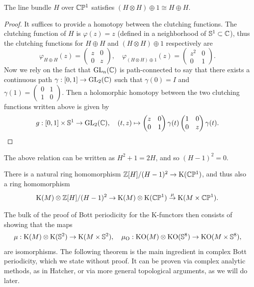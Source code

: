\begin{prop}
    The line bundle $H$ over $\mathbb{C}\mathbb{P}^1$ satisfies $(H\otimes H)\oplus 1\cong H\oplus H$.
\end{prop}
\begin{proof}
    It suffices to provide a homotopy between the clutching functions. The clutching function of $H$ is $\varphi(z)=z$ (defined in a neighborhood of $\mathbb{S}^1\subset \mathbb{C}$), thus the clutching functions for $H\oplus H$  and $(H\otimes H)\oplus 1$ respectively are
    \[\varphi_{H\oplus H}(z)=\begin{pmatrix}
        z&0\\0&z
    \end{pmatrix},\quad \varphi_{(H\otimes H)\oplus 1}(z)=\begin{pmatrix}
        z^2&0\\0&1
    \end{pmatrix}.\]
    Now we rely on the fact that $\operatorname{GL}_n(\mathbb{C})$ is path-connected to say that there exists a continuous path $\gamma:[0,1]\to \operatorname{GL}_2(\mathbb{C})$ such that $\gamma(0)=I$ and $\gamma(1)=\begin{pmatrix}
        0&1\\1&0
    \end{pmatrix}.$
    Then a holomorphic homotopy between the two clutching functions written above is given by
    \[g:[0,1]\times\mathbb{S}^1\to \operatorname{GL}_2(\mathbb{C}),\quad (t,z)\mapsto \begin{pmatrix}
        z&0\\0&1
    \end{pmatrix}\gamma(t)
    \begin{pmatrix}
        1&0\\0&z
    \end{pmatrix}\gamma(t).\]
\end{proof}
The above relation can be written as $H^2+1=2H$, and so $(H-1)^2=0$.
\begin{cor}
    There is a natural ring homomorphism $\mathbb{Z}[H]\slash (H-1)^2\to \mathrm{K}(\mathbb{C}\mathbb{P}^1)$, and thus also a ring homomorphism
    \[\mathrm{K}(M)\otimes \mathbb{Z}[H]\slash (H-1)^2\to \mathrm{K}(M)\otimes \mathrm{K}(\mathbb{C}\mathbb{P}^1)\overset{\mu}{\to}\mathrm{K}(M\times \mathbb{C}\mathbb{P}^1).\]
\end{cor}

The bulk of the proof of Bott periodicity for the K-functors then consists of showing that the maps 
\[\mu:\mathrm{K}(M)\otimes \mathrm{K}(\mathbb{S}^2)\to \mathrm{K}(M\times \mathbb{S}^2),\quad \mu_{\operatorname{O}}:\mathrm{KO}(M)\otimes \mathrm{KO}(\mathbb{S}^8)\to \mathrm{KO}(M\times\mathbb{S}^8),\]
are isomorphisms. The following theorem is the main ingredient in complex Bott periodicity, which we state without proof. It can be proven via complex analytic methods, as in Hatcher, or via more general topological arguments, as we will do later.

